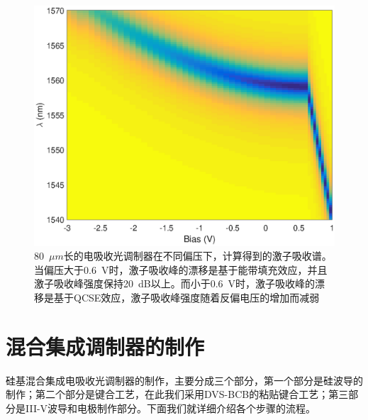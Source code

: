 \begin{figure}[htb]
	\centering
	\includegraphics[width=14cm]{./Pictures/chapt4_bandfilling_sim.eps}
	\caption{80~$\mu m$长的电吸收光调制器在不同偏压下，计算得到的激子吸收谱。当偏压大于0.6~V时，激子吸收峰的漂移是基于能带填充效应，并且激子吸收峰强度保持20~dB以上。而小于0.6~V时，激子吸收峰的漂移是基于QCSE效应，激子吸收峰强度随着反偏电压的增加而减弱}
	\label{chapt4_bandfilling_sim}
\end{figure}

\section{混合集成调制器的制作}
硅基混合集成电吸收光调制器的制作，主要分成三个部分，第一个部分是硅波导的制作；第二个部分是键合工艺，在此我们采用DVS-BCB的粘贴键合工艺；第三部分是III-V波导和电极制作部分。下面我们就详细介绍各个步骤的流程。
